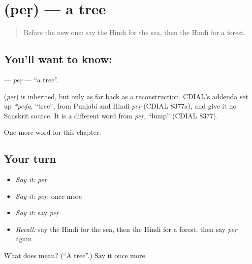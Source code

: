 \section[\texorpdfstring{\hi{पेड़} (peṛ)}{पेड़ (peṛ)}]{ (peṛ) — a tree}

\label{lesson:HI-C143-per}



\begin{quote}
Before the new one: say the Hindi for the sea, then the Hindi for a forest.
\end{quote}

\subsection*{You'll want to know: }
\textbf{} — \emph{peṛ} — \textquotedblleft{}a tree\textquotedblright{}.

\begin{cousinweb}
\textbf{} (\emph{peṛ}) is inherited, but only as far back as a reconstruction. CDIAL's addenda set up \emph{*peḍa}, \textquotedblleft{}tree\textquotedblright{}, from Punjabi and Hindi \emph{peṛ} (CDIAL 8377a), and give it no Sanskrit source. It is a different word from \emph{peṛ}, \textquotedblleft{}lump\textquotedblright{} (CDIAL 8377).
\end{cousinweb}

\begin{grammarlens}[title={What you've built}]
One more word for this chapter.
\end{grammarlens}

\subsection*{Your turn}
\begin{itemize}
\raggedright
  \item \emph{Say it:} \emph{peṛ}
  \item \emph{Say it:} \emph{peṛ}, once more
  \item \emph{Say it:} say \emph{peṛ}
  \item \emph{Recall:} say the Hindi for the sea, then the Hindi for a forest, then say \emph{peṛ} again
\end{itemize}

\begin{tcolorbox}[breakable,colback=teal!4,colframe=teal!35!black,title={Before you move on}]
What does  mean? (\textquotedblleft{}A tree\textquotedblright{}.) Say it once more.
\end{tcolorbox}
